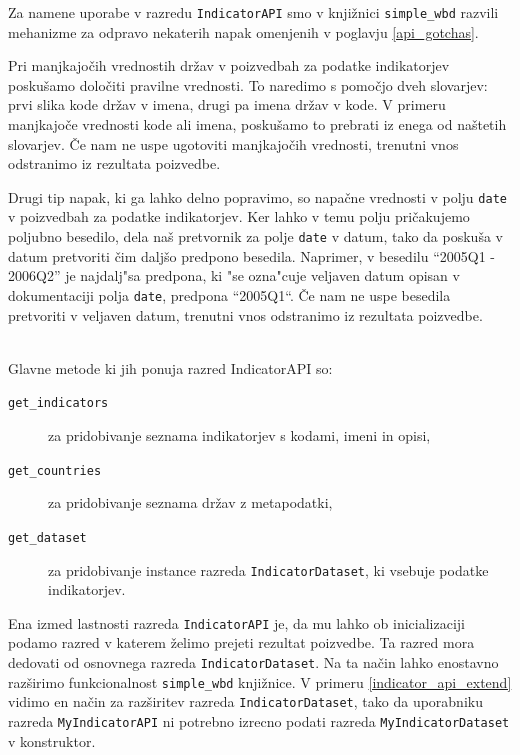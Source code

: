Za namene uporabe v razredu \verb|IndicatorAPI| smo v knjižnici \verb|simple_wbd|
razvili mehanizme za odpravo nekaterih napak omenjenih v poglavju 
\ref{api_gotchas}.

Pri manjkajočih vrednostih držav v poizvedbah za podatke indikatorjev
poskušamo določiti pravilne vrednosti. To naredimo s pomočjo dveh
slovarjev: prvi slika kode držav v imena, drugi pa imena držav v kode. V
primeru manjkajoče vrednosti kode ali imena, poskušamo to prebrati iz enega
od naštetih slovarjev. Če nam ne uspe ugotoviti manjkajočih vrednosti,
trenutni vnos odstranimo iz rezultata poizvedbe.

Drugi tip napak, ki ga lahko delno popravimo, so napačne vrednosti v polju
\verb|date| v poizvedbah za podatke indikatorjev. Ker lahko v temu polju
pričakujemo poljubno besedilo, dela naš pretvornik za polje \verb|date| v 
datum, tako da poskuša v datum pretvoriti čim daljšo predpono besedila. Naprimer, 
v besedilu ``2005Q1 - 2006Q2'' je najdalj"sa predpona, ki "se ozna"cuje veljaven datum opisan
v dokumentaciji polja {\tt date}, 
predpona ``2005Q1``.
Če nam ne uspe besedila pretvoriti v veljaven datum, trenutni vnos odstranimo
iz rezultata poizvedbe.


\ \\
Glavne metode ki jih ponuja razred IndicatorAPI so:

\begin{description}  
\item [\tt get\_indicators] za pridobivanje seznama indikatorjev s kodami, imeni
      in opisi,
\item [\tt get\_countries] za pridobivanje seznama držav z metapodatki,
\item [\tt get\_dataset] za pridobivanje instance razreda \verb|IndicatorDataset|,
      ki vsebuje podatke indikatorjev.
\end{description}

Ena izmed lastnosti razreda \verb|IndicatorAPI| je, da mu lahko ob
inicializaciji podamo razred v katerem želimo prejeti rezultat poizvedbe. Ta
razred mora dedovati od osnovnega razreda \verb|IndicatorDataset|. Na ta
način lahko enostavno razširimo funkcionalnost \verb|simple_wbd| knjižnice.
V primeru \ref{indicator_api_extend} vidimo en način za razširitev razreda 
\verb|IndicatorDataset|, tako da uporabniku razreda \verb|MyIndicatorAPI| ni
potrebno izrecno podati razreda {\tt MyIndicatorDataset} v konstruktor.

